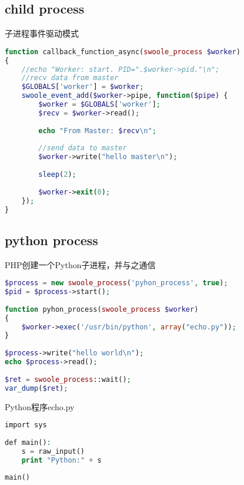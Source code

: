 \subsection{child process}

子进程事件驱动模式

\begin{lstlisting}[language=PHP]
function callback_function_async(swoole_process $worker)
{
    //echo "Worker: start. PID=".$worker->pid."\n";
    //recv data from master
    $GLOBALS['worker'] = $worker;
    swoole_event_add($worker->pipe, function($pipe) {
        $worker = $GLOBALS['worker'];
        $recv = $worker->read();
 
        echo "From Master: $recv\n";
 
        //send data to master
        $worker->write("hello master\n");
 
        sleep(2);
 
        $worker->exit(0);
    });
}
\end{lstlisting}


\subsection{python process}

PHP创建一个Python子进程，并与之通信

\begin{lstlisting}[language=PHP]
$process = new swoole_process('pyhon_process', true);
$pid = $process->start();
 
function pyhon_process(swoole_process $worker)
{
    $worker->exec('/usr/bin/python', array("echo.py"));
}
 
$process->write("hello world\n");
echo $process->read();
 
$ret = swoole_process::wait();
var_dump($ret);
\end{lstlisting}

Python程序echo.py


\begin{lstlisting}[language=PHP]
import sys
 
def main():
    s = raw_input()
    print "Python:" + s
 
main()
\end{lstlisting}





\begin{lstlisting}[language=PHP]

\end{lstlisting}




